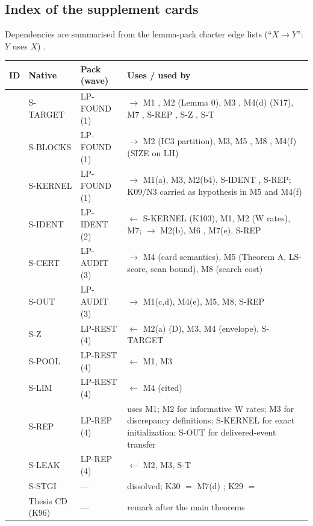 \subsection{Index of the supplement cards}\label{sec:supp-index}
Dependencies are summarised from the lemma-pack charter edge lists (``$X\to Y$'': $Y$ uses $X$) .

{\small
\begin{xltabular}{\textwidth}{@{}l l l X@{}}
\toprule
ID & Native & Pack (wave) & Uses / used by \\
\midrule
{} & S-TARGET & LP-FOUND (1) & $\to$ M1 , M2  (Lemma 0), M3 , M4(d)  (N17), M7 , S-REP , S-Z , S-T  \\
 & S-BLOCKS & LP-FOUND (1) & $\to$ M2 (IC3 partition), M3, M5 , M8 , M4(f) (SIZE on LH) \\
 & S-KERNEL & LP-FOUND (1) & $\to$ M1(a), M3, M2(b4), S-IDENT , S-REP; K09/N3 carried as hypothesis in M5 and M4(f) \\
 & S-IDENT & LP-IDENT (2) & $\leftarrow$ S-KERNEL (K103), M1, M2 (W rates), M7; $\to$ M2(b), M6 , M7(e), S-REP \\
 & S-CERT & LP-AUDIT (3) & $\to$ M4 (card semantics), M5 (Theorem A, LS-score, scan bound), M8 (search cost) \\
 & S-OUT & LP-AUDIT (3) & $\to$ M1(c,d), M4(e), M5, M8, S-REP \\
 & S-Z & LP-REST (4) & $\leftarrow$ M2(a) (D), M3, M4 (envelope), S-TARGET \\
 & S-POOL & LP-REST (4) & $\leftarrow$ M1, M3 \\
 & S-LIM & LP-REST (4) & $\leftarrow$ M4 (cited) \\
 & S-REP & LP-REP (4) & uses M1; M2 for informative W rates; M3 for discrepancy definitions; S-KERNEL for exact initialization; S-OUT for delivered-event transfer \\
 & S-LEAK & LP-REP (4) & $\leftarrow$ M2, M3, S-T \\
 & S-STGI & --- & dissolved; K30 $=$ M7(d) ; K29 $=$  \\
 & Thesis CD (K96) & --- & remark after the main theorems \\
\bottomrule
\end{xltabular}
}

